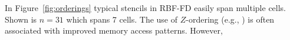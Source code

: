 \documentclass{report}
\begin{document}
%

In Figure~\ref{fig:orderings} typical stencils in RBF-FD easily span multiple cells. Shown is $n=31$ which spans 7 cells. The use of $Z$-ordering (e.g., \cite{Goswami2010}) is often associated with improved memory access patterns. However, 

\end{document}
